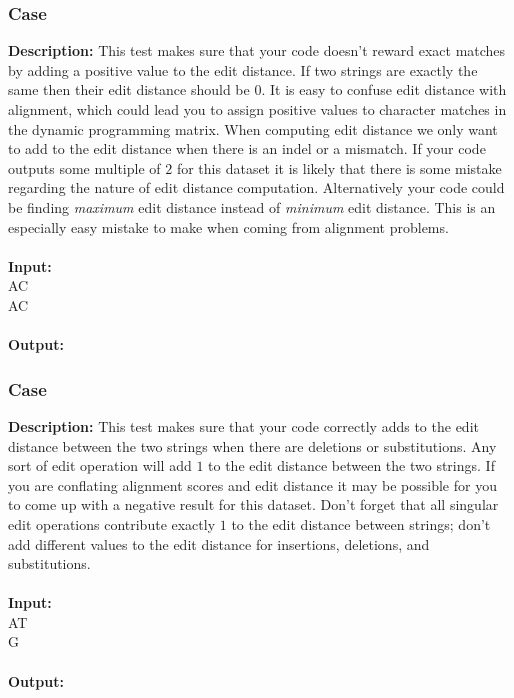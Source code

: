 \documentclass{article}
\newcommand{\code}[1]{{\fontfamily{pcr}\selectfont #1}}
\begin{document}
\subsubsection*{Case }
\hline \vspace{5}
\textbf{Description:} This test makes sure that your code doesn’t reward exact matches by adding a positive value to the edit distance. If two strings are exactly the same then their edit distance should be $0$. It is easy to confuse edit distance with alignment, which could lead you to assign positive values to character matches in the dynamic programming matrix. When computing edit distance we only want to add to the edit distance when there is an indel or a mismatch. If your code outputs some multiple of $2$ for this dataset it is likely that there is some mistake regarding the nature of edit distance computation. Alternatively your code could be finding \emph{maximum} edit distance instead of \emph{minimum} edit distance. This is an especially easy mistake to make when coming from alignment problems.\\ \\
\noindent \textbf{Input:}\\
\code{AC\\AC}\\ \\
\noindent \textbf{Output:}\\
\code{0}
\pagebreak

\subsubsection*{Case }
\hline \vspace{5}
\textbf{Description:} This test makes sure that your code correctly adds to the edit distance between the two strings when there are deletions or substitutions. Any sort of edit operation will add $1$ to the edit distance between the two strings. If you are conflating alignment scores and edit distance it may be possible for you to come up with a negative result for this dataset. Don’t forget that all singular edit operations contribute exactly $1$ to the edit distance between strings; don’t add different values to the edit distance for insertions, deletions, and substitutions.\\ \\
\noindent \textbf{Input:}\\
\code{AT\\G}\\ \\
\noindent \textbf{Output:}\\
\code{2}
\end{document}
